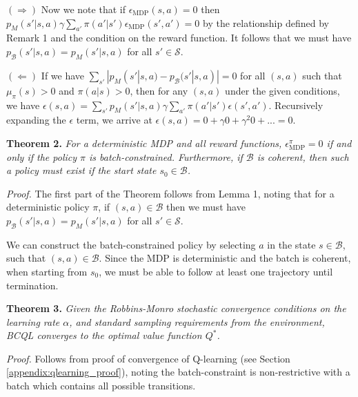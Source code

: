 \documentclass{article}
\newcommand{\e}{\epsilon}
\newcommand{\y}{\gamma}
\newcommand{\al}{\alpha}
\newcommand{\E}{\mathbb{E}}
\newcommand{\B}{\mathcal{B}}
\begin{document}
$(\Rightarrow)$ Now we note that if $\e_{\text{MDP}}(s,a) = 0$ then $p_M(s'|s,a) \y \sum_{a'} \pi(a'|s') \e_{\text{MDP}}(s',a') = 0$ by the relationship defined by Remark 1 and the condition on the reward function. It follows that we must have $p_\B(s'|s,a) = p_M(s'|s,a)$ for all $s' \in \mathcal{S}$.

$(\Leftarrow)$ If we have $\sum_{s'} |p_M(s'|s,a) - p_\B(s'|s,a)| = 0$ for all $(s,a)$ such that $\mu_\pi(s) > 0$ and $\pi(a|s) > 0$, then for any $(s,a)$ under the given conditions, we have $\e(s,a) = \sum_{s'} p_M(s'|s,a) \y \sum_{a'} \pi(a'|s')\e(s',a')$. Recursively expanding the $\e$ term, we arrive at $\e(s,a) = 0 + \y 0 + \y^2 0 + ... = 0$. 



\bigskip

\textbf{Theorem 2.} \textit{For a deterministic MDP and all reward functions, $\e^\pi_{\text{MDP}} = 0$ if and only if the policy $\pi$ is batch-constrained. Furthermore, if $\B$ is coherent, then such a policy must exist if the start state $s_0 \in \B$.}

\textit{Proof.} The first part of the Theorem follows from Lemma 1, noting that for a deterministic policy $\pi$, if $(s,a) \in \B$ then we must have $p_\B(s'|s,a) = p_M(s'|s,a)$ for all $s' \in \mathcal{S}$. 

We can construct the batch-constrained policy by selecting $a$ in the state $s \in \B$, such that $(s,a) \in \B$. Since the MDP is deterministic and the batch is coherent, when starting from $s_0$, we must be able to follow at least one trajectory until termination. 

\bigskip

\textbf{Theorem 3.} \textit{Given the Robbins-Monro stochastic convergence conditions on the learning rate $\al$, and standard sampling requirements from the environment, BCQL converges to  the optimal value function $Q^*$.}

\textit{Proof.} Follows from proof of convergence of Q-learning (see Section \ref{appendix:qlearning_proof}), noting the batch-constraint is non-restrictive with a batch which contains all possible transitions.
\end{document}
